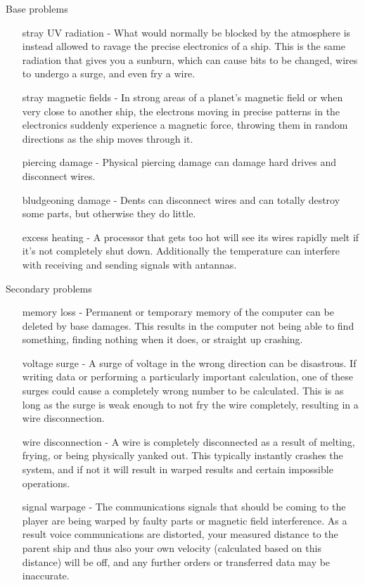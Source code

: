 \documentclass[a4paper]{article}
\begin{document}
\vspace{0.2cm}
Base problems
\begin{enumerate}[leftmargin=4cm]
\item [stray UV radiation] - What would normally be blocked by the atmosphere is instead allowed to ravage the precise electronics of a ship. This is the same radiation that gives you a sunburn, which can cause bits to be changed, wires to undergo a surge, and even fry a wire.
\item [stray magnetic fields] - In strong areas of a planet's magnetic field or when very close to another ship, the electrons moving in precise patterns in the electronics suddenly experience a magnetic force, throwing them in random directions as the ship moves through it.
\item [piercing damage] - Physical piercing damage can damage hard drives and disconnect wires.
\item [bludgeoning damage] - Dents can disconnect wires and can totally destroy some parts, but otherwise they do little.
\item [excess heating] - A processor that gets too hot will see its wires rapidly melt if it's not completely shut down. Additionally the temperature can interfere with receiving and sending signals with antannas. 
\end{enumerate}

\vspace{0.2cm}
Secondary problems
\begin{enumerate}[leftmargin=4cm]
\item [memory loss] - Permanent or temporary memory of the computer can be deleted by base damages. This results in the computer not being able to find something, finding nothing when it does, or straight up crashing.
\item [voltage surge] - A surge of voltage in the wrong direction can be disastrous. If writing data or performing a particularly important calculation, one of these surges could cause a completely wrong number to be calculated. This is as long as the surge is weak enough to not fry the wire completely, resulting in a wire disconnection.
\item [wire disconnection] - A wire is completely disconnected as a result of melting, frying, or being physically yanked out. This typically instantly crashes the system, and if not it will result in warped results and certain impossible operations.
\item [signal warpage] - The communications signals that should be coming to the player are being warped by faulty parts or magnetic field interference. As a result voice communications are distorted, your measured distance to the parent ship and thus also your own velocity (calculated based on this distance) will be off, and any further orders or transferred data may be inaccurate.
\end{enumerate}
\end{document}
